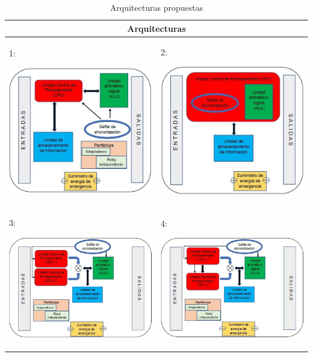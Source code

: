 \begin{table}[H]
	\centering
	\caption{Arquitecturas propuestas}
	\begin{tabular}{@{}|p{7cm}|p{7cm}|} 
		\hline
		\multicolumn{2}{|c|}{\textbf{Arquitecturas}} \\
		\hline \hline
		1:
		\begin{center}
			\includegraphics[width=6.5cm]{imagenes/arqui1}
		\end{center}
	 & 
		2:
		\begin{center}
			\includegraphics[width=6.5cm]{imagenes/arqui2}
		\end{center}
  \\ \hline
		3:
		\begin{center}
			\includegraphics[width=6.5cm]{imagenes/arqui3}
		\end{center}
	 &
		4:
		\begin{center}
			\includegraphics[width=6.5cm]{imagenes/arqui4}
		\end{center}
	 \\ \hline
	\end{tabular}		
	\label{tabla:arqui}
\end{table}


